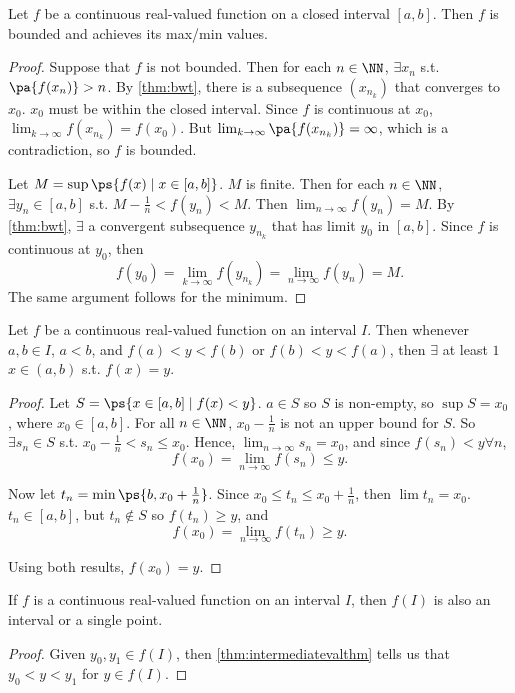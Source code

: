 \documentclass[11pt]{scrartcl}
\numberwithin{equation}{section}
\begin{document}
\begin{theorem}
    Let $f$ be a continuous real-valued function on a closed interval 
    $[a,b]$. Then $f$ is bounded and achieves its max/min values.
\end{theorem}
\begin{proof}
    Suppose that $f$ is not bounded. Then for each $n\in \NN$, 
    $\exists x_n$ s.t. $\pa{f(x_n)}>n$. By \cref{thm:bwt},
    there is a subsequence $(x_{n_k})$ that converges to $x_0$.
    $x_0$ must be within the closed interval. Since $f$ is continuous at 
    $x_0$, $\lim_{k\rightarrow \infty}f(x_{n_k}) =f(x_0)$.
    But $\lim_{k\rightarrow \infty}\pa{f(x_{n_k})} = \infty$,
    which is a contradiction, so $f$ is bounded.
    
    Let $M = \sup\ps{f(x)\mid x\in[a,b]}$. $M$ is finite.
    Then for each $n\in \NN$, $\exists y_n\in[a,b]$ s.t. $M-\frac{1}{n}<f(y_n) < M$. Then $\lim_{n\rightarrow \infty}f(y_n) = M$.
    By \cref{thm:bwt}, $\exists$ a convergent subsequence $y_{n_k}$
    that has limit $y_0$ in $[a,b]$. 
    Since $f$ is continuous at $y_0$, then 
    \[ f(y_0) = \lim_{k\rightarrow \infty}f(y_{n_k}) = \lim_{n\rightarrow \infty}f(y_n) = M. \]
    The same argument follows for the minimum.
\end{proof}
\begin{theorem}
    \label{thm:intermediatevalthm}
    Let $f$ be a continuous real-valued function on an interval $I$.
    Then whenever $a,b\in I$, $a<b$, and $f(a) < y < f(b)$ or 
    $f(b) < y < f(a)$, then $\exists$ at least $1$ $x\in(a,b)$ s.t.
    $f(x) = y$.
\end{theorem}
\begin{proof}
    Let $S = \ps{x\in [a,b] \mid f(x)<y}$.
    $a\in S$ so $S$ is non-empty, so $\sup S = x_0$, where $x_0 \in [a,b]$.
    For all $n\in \NN$, $x_0-\frac{1}{n}$ is not an upper bound for $S$.
    So $\exists s_n\in S$ s.t. $x_0-\frac{1}{n}<s_n\leq x_0$. Hence, 
    $\lim_{n\rightarrow \infty}s_n=x_0$, and since $f(s_n)<y \forall n$,
    \[ f(x_0) = \lim_{n\rightarrow \infty}f(s_n)\leq y.\] 

    Now let $t_n = \min\ps{b, x_0+\frac{1}{n}}$. 
    Since $x_0\leq t_n\leq x_0+\frac{1}{n}$, then 
    $\lim t_n = x_0$.
    $t_n\in[a,b]$, but $t_n\notin S$ so $f(t_n)\geq y$, and 
    \[ f(x_0) = \lim_{n\rightarrow \infty}f(t_n)\geq y.\]

    Using both results, $f(x_0) = y$.
\end{proof}
\begin{corollary}
    If $f$ is a continuous real-valued function on an interval $I$, 
    then $f(I)$ is also an interval or a single point.
\end{corollary}
\begin{proof}
    Given $y_0,y_1\in f(I)$, then \cref{thm:intermediatevalthm} tells us 
    that $y_0<y<y_1$ for $y \in f(I)$.
\end{proof}
\clearpage
\end{document}
